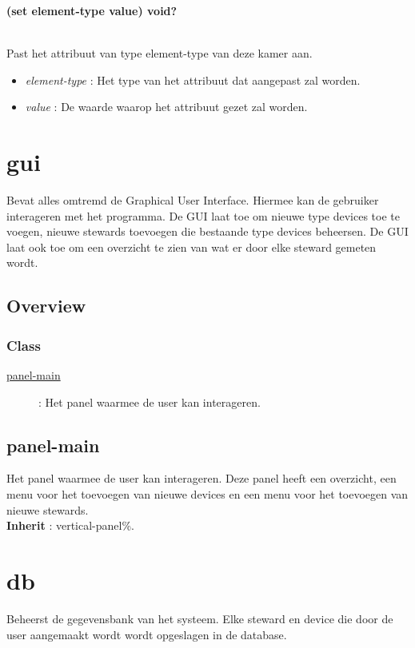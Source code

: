 \documentclass{article}
\newcommand{\ar}{\ding{213} }
\newcommand{\code}[1]{\textcolor{code}{#1}}
\newcommand{\lb}[1][]{\code{(#1}}
\newcommand{\rb}{\code{)}}
\newcommand{\racket}[1]{
	{\color{blue}\textbf{#1}}
}
\begin{document}
\begin{framed}
	\hypertarget{physical-room:set}{\racket{\lb[set] element-type value\rb \ar \code{void?}}}
	\\Past het attribuut van type element-type van deze kamer aan.
	\begin{itemize}
		\item \emph{element-type} : Het type van het attribuut dat aangepast zal worden.
		\item \emph{value} : De waarde waarop het attribuut gezet zal worden.
	\end{itemize}
\end{framed}

\newpage
\hypertarget{gui}{\section{gui}}
Bevat alles omtremd de Graphical User Interface. Hiermee kan de gebruiker interageren met het programma. De GUI laat toe om nieuwe type devices toe te voegen, nieuwe stewards toevoegen die bestaande type devices beheersen. De GUI laat ook toe om een overzicht te zien van wat er door elke steward gemeten wordt.

\subsection{Overview}

\subsubsection{Class}
\begin{description}
	\item[\hyperlink{panel-main}{panel-main}] : Het panel waarmee de user kan interageren.
\end{description}

\newpage
\hypertarget{panel-main}{\subsection{panel-main}}
Het panel waarmee de user kan interageren. Deze panel heeft een overzicht, een menu voor het toevoegen van nieuwe devices en een menu voor het toevoegen van nieuwe stewards.
\\\textbf{Inherit} : vertical-panel\%.

\newpage
\hypertarget{db}{\section{db}}
Beheerst de gegevensbank van het systeem. Elke steward en device die door de user aangemaakt wordt wordt opgeslagen in de database.
\end{document}
